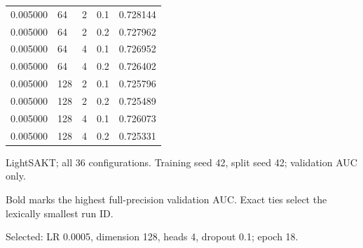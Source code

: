 \begin{table}[htbp]
{\begin{tabular}{lllll}
0.005000 & 64 & 2 & 0.1 & 0.728144 \\
0.005000 & 64 & 2 & 0.2 & 0.727962 \\
0.005000 & 64 & 4 & 0.1 & 0.726952 \\
0.005000 & 64 & 4 & 0.2 & 0.726402 \\
0.005000 & 128 & 2 & 0.1 & 0.725796 \\
0.005000 & 128 & 2 & 0.2 & 0.725489 \\
0.005000 & 128 & 4 & 0.1 & 0.726073 \\
0.005000 & 128 & 4 & 0.2 & 0.725331 \\
\bottomrule
\end{tabular}}
\begin{minipage}{\textwidth}\footnotesize
LightSAKT; all 36 configurations. Training seed 42, split seed 42; validation AUC only.\par Bold marks the highest full-precision validation AUC. Exact ties select the lexically smallest run ID.\par Selected: LR 0.0005, dimension 128, heads 4, dropout 0.1; epoch 18.
\end{minipage}
\end{table}
